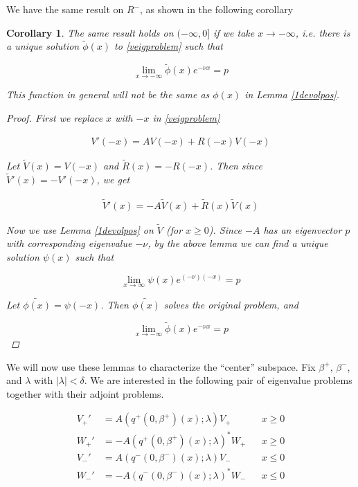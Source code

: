 \documentclass[12pt]{article}
\newtheorem{corollary}{Corollary}
\begin{document}
We have the same result on $R^-$, as shown in the following corollary


\begin{corollary}\label{1devolneg}
The same result holds on $(-\infty, 0]$ if we take $x \rightarrow -\infty$, i.e. there is a unique solution $\tilde{\phi}(x)$ to \eqref{veigproblem} such that 

\[
\lim_{x\rightarrow -\infty} \tilde{\phi}(x) e^{-\nu x} = p
\]

This function in general will not be the same as $\phi(x)$ in Lemma \ref{1devolpos}.

\begin{proof}
First we replace $x$ with $-x$ in \eqref{veigproblem}

\begin{align*}
V'(-x) = A V(-x) + R(-x)V(-x)
\end{align*}

Let $\tilde{V}(x) = V(-x)$ and $\tilde{R}(x) = -R(-x)$. Then since $\tilde{V}'(x) = -V'(-x)$, we get

\begin{align*}
\tilde{V}'(x) = -A \tilde{V}(x) + \tilde{R}(x)\tilde{V}(x)
\end{align*}

Now we use Lemma \ref{1devolpos} on $\tilde{V}$ (for $x \geq 0$). Since $-A$ has an eigenvector $p$ with corresponding eigenvalue $-\nu$, by the above lemma we can find a unique solution $\psi(x)$ such that 

\[
\lim_{x\rightarrow \infty} \psi(x) e^{(-\nu)(-x)} = p
\]

Let $\tilde{\phi(x)} = \psi(-x)$. Then $\tilde{\phi(x)}$ solves the original problem, and

\[
\lim_{x\rightarrow -\infty} \tilde{\phi}(x) e^{-\nu x } = p
\]

\end{proof}
\end{corollary}

We will now use these lemmas to characterize the ``center'' subspace. Fix $\beta^+$, $\beta^-$, and $
\lambda$ with $|\lambda| < \delta$. We are interested in the following pair of eigenvalue problems together with their adjoint problems.

\begin{align}
V_+' &= A(q^+(0, \beta^+)(x); \lambda) V_+ && x \geq 0 \label{eig:V+} \\
W_+' &= -A(q^+(0, \beta^+)(x); \lambda)^* W_+ && x \geq 0\label{eig:W+} \\
V_-' &= A(q^-(0, \beta^-)(x); \lambda) V_- && x \leq 0 \label{eig:V-} \\
W_-' &= -A(q^-(0, \beta^-)(x); \lambda)^* W_- && x \leq 0 \label{eig:W-}
\end{align}
\end{document}
